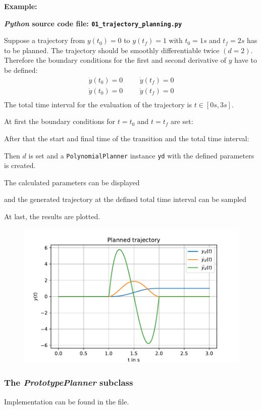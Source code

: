 \documentclass[a4paper,11pt,headings=standardclasses,parskip=half]{scrartcl}
\newcommand{\listcode}[3]{}
\newcommand{\listcodeplanning}[2]{\listcode{#1}{#2}{../sim/01_trajectory_planning.py}}
\newcommand{\py}{\emph{Python}\xspace}
\begin{document}
\textbf{Example:}

\textbf{\py source code file: \texttt{01\_trajectory\_planning.py}}

Suppose a trajectory from $y(t_0)=0$ to $y(t_f) = 1$ with $t_0=1s$ and $t_f = 2s$ has to be planned. The trajectory should be smoothly differentiable twice $(d=2)$. Therefore the boundary conditions for the first and second derivative of $y$ have to be defined: 
\begin{align*}
\dot{y}(t_0)=0 &&& \dot{y}(t_f)=0 \\
\ddot{y}(t_0)=0 &&& \ddot{y}(t_f)=0 \\
\end{align*}
The total time interval for the evaluation of the trajectory is $t\in[0s,3s]$.

At first the boundary conditions for $t=t_0$ and $t=t_f$ are set:
\listcodeplanning{7}{8}
After that the start and final time of the transition and the total time interval:
\listcodeplanning{9}{11}
Then $d$ is set and a \texttt{PolynomialPlanner} instance \texttt{yd} with the defined parameters is created.
\listcodeplanning{12}{13}
The calculated parameters can be displayed
\listcodeplanning{15}{16}
and the generated trajectory at the defined total time interval can be sampled
\listcodeplanning{18}{19}
At last, the results are plotted.
\listcodeplanning{21}{27}
\begin{figure}[ht]
\centering
\includegraphics[scale=0.9]{img/planned_trajectory.pdf}
\end{figure}
\subsubsection{The \emph{PrototypePlanner} subclass}
Implementation can be found in the file.
\newpage
\end{document}

